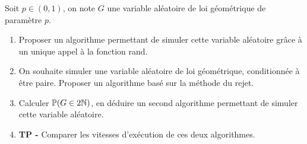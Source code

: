 \documentclass[solutions]{exercices}
\begin{document}
\begin{exercice}
Soit $p \in (0,1)$, on note $G$ une variable aléatoire de loi géométrique de paramètre $p$.
\begin{enumerate}
  \item Proposer un algorithme permettant de simuler cette variable aléatoire grâce à un unique appel à la fonction rand.
  \item On souhaite simuler une variable aléatoire de loi géométrique, conditionnée à être paire. Proposer un algorithme basé sur la méthode du rejet.
  \item Calculer $\mathbb{P}(G \in 2 \mathbb{N})$, en déduire un second algorithme permettant de simuler cette variable aléatoire.
  \item \textbf{TP -} Comparer les vitesses d'exécution de ces deux algorithmes.
\end{enumerate}
\end{exercice}
\end{document}
